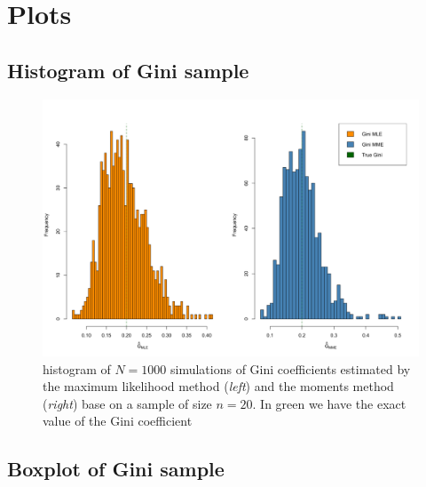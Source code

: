 \section{Plots}

\subsection{Histogram of Gini sample}

\begin{figure}[H]
  \centering
  \includegraphics[width=\textwidth]{figures/png/gini_sample_histogram.png}
  \caption{histogram of $N = 1000$ simulations of Gini coefficients estimated by the maximum likelihood method (\textit{left}) and the moments method (\textit{right}) base on a sample of size $n = 20$. In green we have the exact value of the Gini coefficient}
  \label{fig:gini-sample-histogram-N=1000}
\end{figure}

\subsection{Boxplot of Gini sample}

